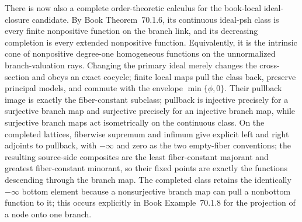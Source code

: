 \documentclass[11pt,a4paper]{article}
\theoremstyle{definition}
\theoremstyle{remark}
\begin{document}
There is now also a complete order-theoretic calculus for the book-local
ideal-closure candidate.  By
Book Theorem~70.1.6, its continuous ideal-psh
class is every finite nonpositive function on the branch link, and its
decreasing completion is every extended nonpositive function.  Equivalently,
it is the intrinsic cone of nonpositive degree-one homogeneous functions on
the unnormalized branch-valuation rays.  Changing the primary ideal merely
changes the cross-section and obeys an exact cocycle; finite local maps pull
the class back, preserve principal models, and commute with the envelope
\(\min\{\phi,0\}\).  Their pullback image is exactly the fiber-constant
subclass; pullback is injective precisely for a surjective branch map and
surjective precisely for an injective branch map, while surjective branch
maps act isometrically on the continuous class.  On the completed lattices,
fiberwise supremum and infimum give explicit left and right adjoints to
pullback, with \(-\infty\) and zero as the two empty-fiber conventions; the
resulting source-side composites are the least fiber-constant majorant and
greatest fiber-constant minorant, so their fixed points are exactly the
functions descending through the branch map.
The completed class retains
the identically
\(-\infty\) bottom element because a nonsurjective branch map can pull a
nonbottom function to it; this occurs explicitly in
Book Example~70.1.8 for the projection of a node onto
one branch.
\end{document}
